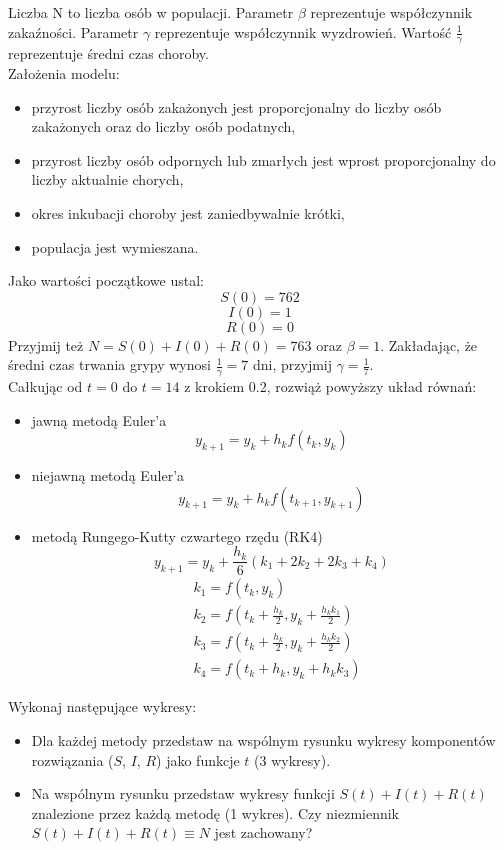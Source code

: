 \documentclass[11pt, leqno]{scrartcl}
\begin{document}
    \subsubsection*{}
    Liczba N to liczba osób w populacji. Parametr $\beta$
    reprezentuje współczynnik zakaźności. Parametr $\gamma$
    reprezentuje współczynnik wyzdrowień. Wartość
    $\frac{1}{\gamma}$ reprezentuje średni czas choroby. \\
    Założenia modelu:
    \begin{itemize}
        \item przyrost liczby osób zakażonych jest proporcjonalny
            do liczby osób zakażonych oraz do liczby osób
            podatnych,
        \item przyrost liczby osób odpornych lub zmarłych jest
            wprost proporcjonalny do liczby aktualnie chorych,
        \item okres inkubacji choroby jest zaniedbywalnie krótki,
        \item populacja jest wymieszana.
    \end{itemize}
    Jako wartości początkowe ustal:
    \[
        S(0)=762
    \]
    \[
        I(0)=1
    \]
    \[
        R(0)=0
    \]
    Przyjmij też $N=S(0)+I(0)+R(0)=763$ oraz $\beta =1$.
    Zakładając, że średni czas trwania grypy wynosi
    $\frac{1}{\gamma}=7$ dni, przyjmij $\gamma =\frac{1}{7}$. \\
    Całkując od $t=0$ do $t=14$ z krokiem 0.2, rozwiąż powyższy
    układ równań:
    \begin{itemize}
        \item jawną metodą Euler'a
            \[
                y_{k+1}=y_k+h_kf(t_k, y_k)
            \]
        \item niejawną metodą Euler'a
            \[
                y_{k+1}=y_k+h_kf(t_{k+1}, y_{k+1})
            \]
        \item metodą Rungego-Kutty czwartego rzędu (RK4)
            \[
                y_{k+1}=y_k+\frac{h_k}{6}(k_1+2k_2+2k_3+k_4)
            \]
            \begin{align*}
                &k_1=f(t_k,y_k) \\
                &k_2=f \left( t_k+\frac{h_k}{2},
                    y_k+\frac{h_kk_1}{2} \right) \\
                &k_3=f \left( t_k+\frac{h_k}{2},
                    y_k+\frac{h_kk_2}{2} \right) \\
                &k_4=f(t_k+h_k,y_k+h_kk_3)
            \end{align*}
    \end{itemize}
    Wykonaj następujące wykresy:
    \begin{itemize}
        \item Dla każdej metody przedstaw na wspólnym rysunku
            wykresy komponentów rozwiązania ($S$, $I$, $R$) jako
            funkcje $t$ (3 wykresy).
        \item Na wspólnym rysunku przedstaw wykresy funkcji
            $S(t)+I(t)+R(t)$ znalezione przez każdą metodę
            (1 wykres). Czy niezmiennik $S(t)+I(t)+R(t) \equiv N$
            jest zachowany?
    \end{itemize}
\end{document}
